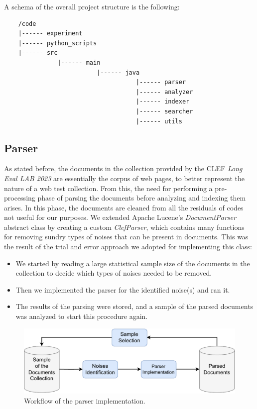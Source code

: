 \newpage

A schema of the overall project structure is the following:
\begin{lstlisting}    
    /code
    |------ experiment
    |------ python_scripts
    |------ src
               |------ main
                          |------ java
                                     |------ parser
                                     |------ analyzer
                                     |------ indexer
                                     |------ searcher
                                     |------ utils
\end{lstlisting}

\subsection{Parser}
As stated before, the documents in the collection provided by the \ac{CLEF} \textit{Long Eval LAB 2023} are essentially the corpus of web pages, to better represent the nature of a web test collection. From this, the need for performing a pre-processing phase of parsing the documents before analyzing and indexing them arises.
In this phase, the documents are cleaned from all the residuals of codes not useful for our purposes. We extended Apache Lucene's \textit{DocumentParser} abstract class by creating a custom \textit{ClefParser}, which contains many functions for removing sundry types of noises that can be present in documents. This was the result of the trial and error approach we adopted for implementing this class:
\begin{itemize}
\item We started by reading a large statistical sample size of the documents in the collection to decide which types of noises needed to be removed.
\item Then we implemented the parser for the identified noise(s) and ran it.
\item The results of the parsing were stored, and a sample of the parsed documents was analyzed to start this procedure again.
\end{itemize}

\begin{figure}[!h]
    \centering
    \includegraphics[width=0.8\linewidth]{figure/Parser_implementation_workflow.pdf}
    \caption{Workflow of the parser implementation.}
    \label{fig:Parser_implementation_workflow}
\end{figure}

